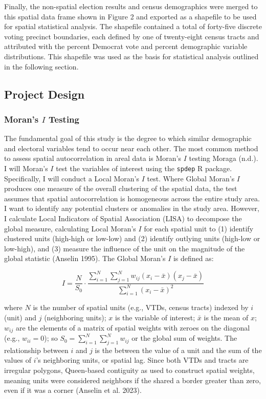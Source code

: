 \documentclass[
]{article}
\begin{document}
Finally, the non-spatial election results and census demographics were
merged to this spatial data frame shown in Figure 2 and exported as a
shapefile to be used for spatial statistical analysis. The shapefile
contained a total of forty-five discrete voting precinct boundaries,
each defined by one of twenty-eight census tracts and attributed with
the percent Democrat vote and percent demographic variable
distributions. This shapefile was used as the basis for statistical
analysis outlined in the following section.

\subsection{Project Design}\label{project-design}

\subsubsection{\texorpdfstring{Moran's \(I\)
Testing}{Moran's I Testing}}\label{morans-i-testing}

The fundamental goal of this study is the degree to which similar
demographic and electoral variables tend to occur near each other. The
most common method to assess spatial autocorrelation in areal data is
Moran's \(I\) testing Moraga (n.d.). I will Moran's \(I\) test the
variables of interest using the \texttt{spdep} R package. Specifically,
I will conduct a Local Moran's \(I\) test. Where Global Moran's \(I\)
produces one measure of the overall clustering of the spatial data, the
test assumes that spatial autocorrelation is homogeneous across the
entire study area. I want to identify any potential clusters or
anomalies in the study area. However, I calculate Local Indicators of
Spatial Association (LISA) to decompose the global measure, calculating
Local Moran's \(I\) for each spatial unit to (1) identify clustered
units (high-high or low-low) and (2) identify outlying units (high-low
or low-high), and (3) measure the influence of the unit on the magnitude
of the global statistic (Anselin 1995). The Global Moran's \(I\) is
defined as:

\[
I = \frac{N}{S_0} \cdot \frac{\sum_{i=1}^{N} \sum_{j=1}^{N} w_{ij} (x_i - \bar{x})(x_j - \bar{x})}{\sum_{i=1}^{N} (x_i - \bar{x})^2}
\]

where \(N\) is the number of spatial units (e.g., VTDs, census tracts)
indexed by \(i\) (unit) and \(j\) (neighboring units); \(x\) is the
variable of interest; \(\bar{x}\) is the mean of \(x\); \(w_{ij}\) are
the elements of a matrix of spatial weights with zeroes on the diagonal
(e.g., \(w_{ii} = 0\)); so
\(S_0 = \sum_{i=1}^{N} \sum_{j=1}^{N} w_{ij}\) or the global sum of
weights. The relationship between \(i\) and \(j\) is the between the
value of a unit and the sum of the values of \(i\)'s neighboring units,
or spatial lag. Since both VTDs and tracts are irregular polygons,
Queen-based contiguity as used to construct spatial weights, meaning
units were considered neighbors if the shared a border greater than
zero, even if it was a corner (Anselin et al. 2023).
\end{document}
